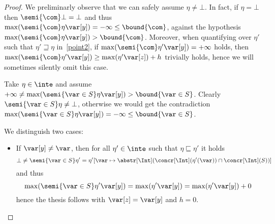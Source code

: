 \begin{proof}
  We preliminarly observe that we can safely assume
  \(\eta \neq \bot\).
  In fact, if \(\eta = \bot\) then \(\semi{\com} \bot = \bot\) and
  thus \(\max(\semi{\com} \eta \var[y]) = -\infty \leq \bound{\com}\),
  against the hypothesis
  \(\max(\semi{\com}\eta \var[y]) > \bound{\com}\). Moreover, when
  quantifying over \(\eta'\) such that \(\eta' \sqsupseteq \eta\)
  in~\ref{point2}, if \(\max(\semi{\com}\eta' \var[y]) = + \infty\)
  holds, then
  \(\max(\semi{\com}\eta' \var[y]) \geq \max(\eta' \var[z]) + h\)
  trivially holds, hence we will sometimes silently omit this case.
  \begin{inductive}
    Take \(\eta \in \inte\) and assume
    \(+\infty\neq\max(\semi{\var \in S}\eta \var[y]) > \bound{\var \in S}\).
    Clearly \(\semi{\var \in S}\eta \neq \bot\), otherwise we would get
    the contradiction
    \(\max(\semi{\var \in S}\eta \var[y]) = -\infty \leq \bound{\var \in
      S}\).
    
    We distinguish two cases:
    \begin{itemize}
      
    \item If \(\var[y] \neq \var\), then for all \(\eta' \in \inte\) such
      that \(\eta \sqsubseteq \eta'\) it holds
      \[\bot \neq \semi{\var \in S}\eta' = \eta'[\var \mapsto
        {\abstr[\Int](\concr[\Int](\eta'(\var)) \cap \concr[\Int](S))}]\]
      and thus
      \begin{equation*}
        \max(\semi{\var \in S}\eta' \var[y]) = \max(\eta' \var[y]) = \max(\eta' \var[y]) + 0
      \end{equation*}
      hence the thesis follows with \(\var[z]=\var[y]\) and \(h = 0\).


\end{itemize}
\end{inductive}
\end{proof}
